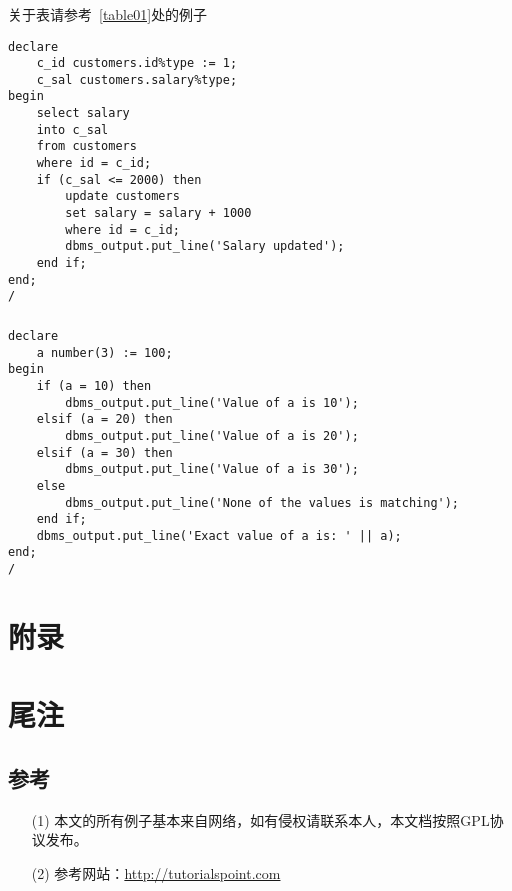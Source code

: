 \documentclass{article}
\begin{document}
\subsubsection{}
\textsf{关于表请参考~\ref{table01}处的例子}
\label{call01}
\begin{verbatim}
declare 
	c_id customers.id%type := 1;
	c_sal customers.salary%type;
begin
	select salary
	into c_sal
	from customers
	where id = c_id;
	if (c_sal <= 2000) then
		update customers
		set salary = salary + 1000
		where id = c_id;
		dbms_output.put_line('Salary updated');
	end if;
end;
/
\end{verbatim}

\subsubsection{}
\begin{verbatim}
declare
	a number(3) := 100;
begin
	if (a = 10) then
		dbms_output.put_line('Value of a is 10');
	elsif (a = 20) then
		dbms_output.put_line('Value of a is 20');
	elsif (a = 30) then
		dbms_output.put_line('Value of a is 30');
	else
		dbms_output.put_line('None of the values is matching');
	end if;
	dbms_output.put_line('Exact value of a is: ' || a);
end;
/
\end{verbatim}

\section{附录}

\section{尾注}
\subsection{参考}
\begin{itemize}
\item[(1)] 本文的所有例子基本来自网络，如有侵权请联系本人，本文档按照GPL协议发布。
\item[(2)] 参考网站：\url{http://tutorialspoint.com}
\end{itemize}
\end{document}

